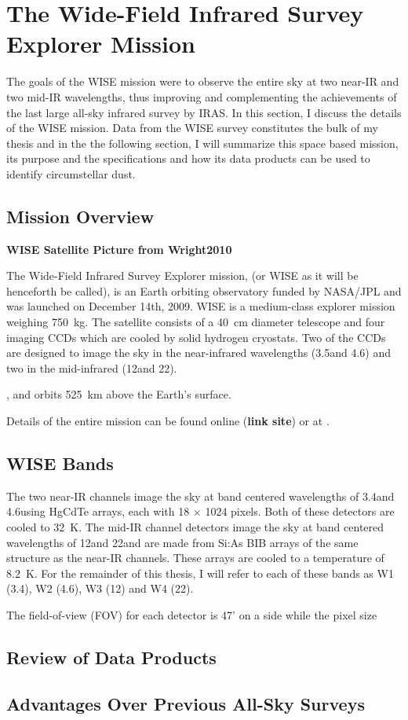 \section{The Wide-Field Infrared Survey Explorer Mission}


    The goals of the WISE mission were to observe the entire sky at two near-IR and two mid-IR wavelengths, thus improving and complementing the achievements of the last large all-sky infrared survey by IRAS. In this section, I discuss the details of the WISE mission. Data from the WISE survey constitutes the bulk of my thesis and in the the following section, I will summarize this space based mission, its purpose and the specifications and how its data products can be used to identify circumstellar dust.
   

\subsection{Mission Overview}\label{sec:wise_overview}

\textbf{WISE Satellite Picture from Wright2010\label{fig:wise_sat}}

    The Wide-Field Infrared Survey Explorer mission, (or WISE as it will be henceforth be called), is an Earth orbiting observatory funded by NASA/JPL and was launched on December 14th, 2009. WISE is a medium-class explorer mission weighing 750~kg. The satellite consists of a 40~cm diameter telescope and four imaging CCDs which are cooled by solid hydrogen cryostats. Two of the CCDs are designed to image the sky in the near-infrared wavelengths (3.5\micron and 4.6\micron) and two in the mid-infrared (12\micron and 22\micron).
    
    
    , and orbits 525~km above the Earth's surface.
    
    
    Details of the entire mission can be found online (\textbf{link site}) or at \citep{Wright2010}. 

    
   
   
\subsection{WISE Bands}\label{sec:wise_bands}
   
   
   The two near-IR channels image the sky at band centered wavelengths of 3.4\micron and 4.6\micron using HgCdTe arrays, each with 18 $\times$ 1024 pixels. Both of these detectors are cooled to 32~K. The mid-IR channel detectors image the sky at band centered wavelengths of 12\micron and 22\micron and are made from Si:As BIB arrays of the same structure as the near-IR channels. These arrays are cooled to a temperature of 8.2~K. For the remainder of this thesis, I will refer to each of these bands as W1 (3.4\micron), W2 (4.6\micron), W3 (12\micron) and W4 (22\micron). 
   
   The field-of-view (FOV) for each detector is 47' on a side while the pixel size 


\subsection{Review of Data Products}


\subsection{Advantages Over Previous All-Sky Surveys}